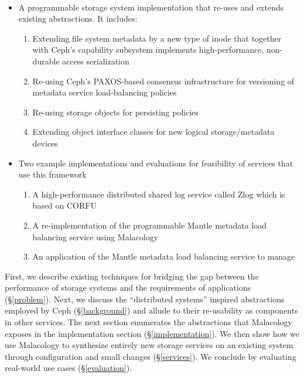 \documentclass[10pt,twocolumn]{article}
\begin{document}
\paragraph{}

\begin{itemize}
\itemsep1pt\parskip0pt
\item A programmable storage system implementation that re-uses and extends existing abstractions. It includes:

  \begin{enumerate}
  \def\labelenumi{\arabic{enumi}.}
  \itemsep1pt\parskip0pt
  \item
    Extending file system metadata by a new type of inode that together with Ceph's capability subsystem implements high-performance, non-durable access serialization
  \item
    Re-using Ceph's PAXOS-based consensus infrastructure for versioning of metadata service load-balancing policies
  \item
    Re-using storage objects for persisting policies
  \item
    Extending object interface classes for new logical storage/metadata devices
  \end{enumerate}
\item
  Two example implementations and evaluations for feasibility of services that use this framework

  \begin{enumerate}
  \def\labelenumi{\arabic{enumi}.}
  \itemsep1pt\parskip0pt
  \item
    A high-performance distributed shared log service called Zlog which is based on CORFU~\autocite{balakrishnan_corfu_2012}
  \item
    A re-implementation of the programmable Mantle metadata load balancing service using Malacology~\autocite{sevilla:sc15-mantle}
  \item 
    An application of the Mantle metadata load balancing service to manage 
  \end{enumerate}
\end{itemize}

First, we describe existing techniques for bridging the gap between the
performance of storage systems and the requirements of applications
(\S\ref{problem}). Next, we discuss the ``distributed systems'' inspired
abstractions employed by Ceph (\S\ref{background}) and allude to their
re-usability as components in other services. The next section
enumerates the abstractions that Malacology exposes in the
implementation section (\S\ref{implementation}). We then show how we use
Malacology to synthesize entirely new storage services on an existing
system through configuration and small changes (\S\ref{services}). We
conclude by evaluating real-world use cases (\S\ref{evaluation}).
\end{document}
